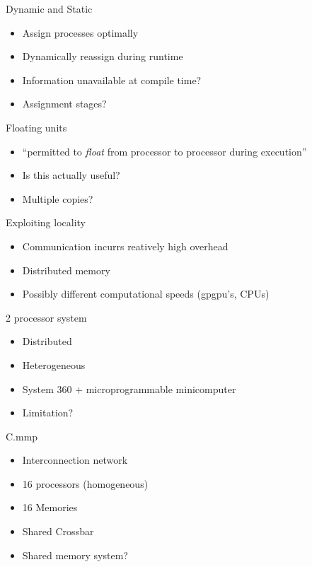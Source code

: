 \documentclass{beamer}
\begin{document}
\begin{frame}{Dynamic and Static}
\begin{itemize}
	\item Assign processes optimally
	\item Dynamically reassign during runtime
	\item Information unavailable at compile time?
	\item Assignment stages?
\end{itemize}
\end{frame}

\begin{frame}{Floating units}
\begin{itemize}
	\item ``permitted to {\em float} from processor to processor during execution''
	\item Is this actually useful?
	\item Multiple copies?
\end{itemize}
\end{frame}

\begin{frame}{Exploiting locality}
\begin{itemize}
	\item Communication incurrs reatively high overhead
	\item Distributed memory
	\item Possibly different computational speeds (gpgpu's, CPUs)
\end{itemize}
\end{frame}

\begin{frame}{2 processor system}
\begin{itemize}
	\item Distributed
	\item Heterogeneous
	\item System 360 + microprogrammable minicomputer \cite{sta74}
	\item Limitation?
\end{itemize}
\end{frame}

\begin{frame}{C.mmp}
\begin{itemize}
	\item Interconnection network \cite{wul72}
	\item 16 processors (homogeneous)
	\item 16 Memories
	\item Shared Crossbar
	\item Shared memory system?
\end{itemize}
\end{frame}
\end{document}
